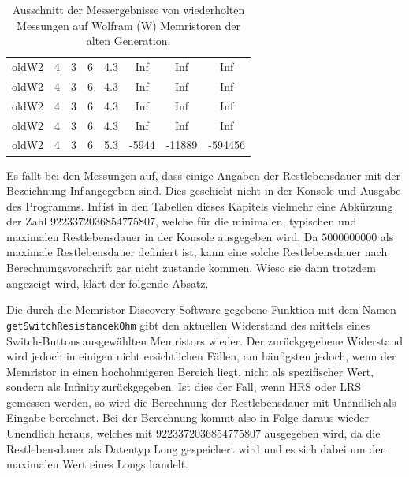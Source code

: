 \begin{table}
\begin{tabular}{l|c|c|c|c|c|c|c}
      oldW2          &  4               & 3                &  6               &  4.3           & Inf            & Inf            & Inf     \\
      oldW2          &  4               & 3                &  6               &  4.3           & Inf            & Inf            & Inf     \\
      oldW2          &  4               & 3                &  6               &  4.3           & Inf            & Inf            & Inf     \\
      oldW2          &  4               & 3                &  6               &  4.3           & Inf            & Inf            & Inf     \\
      oldW2          &  4               & 3                &  6               &  5.3           & -5944          & -11889         & -594456 \\
    \end{tabular}
  \caption{Ausschnitt der Messergebnisse von wiederholten Messungen auf Wolfram (W) Memristoren der alten Generation.}
  \label{tab:Messergebnisse_old}
\end{table}

Es fällt bei den Messungen auf, dass einige Angaben der Restlebensdauer mit der Bezeichnung \glqq Inf\grqq\,angegeben sind. Dies geschieht nicht in der Konsole und Ausgabe des Programms. \glqq Inf\grqq\,ist in den Tabellen dieses Kapitels vielmehr eine Abkürzung der Zahl $9223372036854775807$, welche für die minimalen, typischen und maximalen Restlebensdauer in der Konsole ausgegeben wird. Da $5000000000$ als maximale Restlebensdauer definiert ist, kann eine solche Restlebensdauer nach Berechnungsvorschrift gar nicht zustande kommen. Wieso sie dann trotzdem angezeigt wird, klärt der folgende Absatz.

Die durch die Memristor Discovery Software gegebene Funktion mit dem Namen \lstinline[columns=fixed]{getSwitchResistancekOhm}
gibt den aktuellen Widerstand des mittels eines \glqq Switch-Buttons\grqq\,ausgewählten Memristors wieder. Der zurückgegebene Widerstand wird jedoch in einigen nicht ersichtlichen Fällen, am häufigsten jedoch, wenn der Memristor in einen hochohmigeren Bereich liegt, nicht als spezifischer Wert, sondern als \glqq Infinity\grqq\,zurückgegeben. Ist dies der Fall, wenn HRS oder LRS gemessen werden, so wird die Berechnung der Restlebensdauer mit \glqq Unendlich\grqq\,als Eingabe berechnet. Bei der Berechnung kommt also in Folge daraus wieder Unendlich heraus, welches mit $9223372036854775807$ ausgegeben wird, da die Restlebensdauer als Datentyp Long gespeichert wird und es sich dabei um den maximalen Wert eines Longs handelt.

